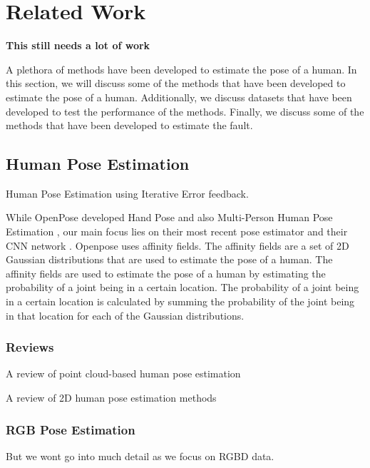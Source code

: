 \section{Related Work}
\label{sec:related_work}

\textbf{This still needs a lot of work}


A plethora of methods have been developed to estimate the pose of a human. In this section, we will discuss some of the methods that have been developed to estimate the pose of a human. Additionally, we discuss datasets that have been developed to test the performance of the methods. Finally, we discuss some of the methods that have been developed to estimate the fault.

\subsection{Human Pose Estimation}


Human Pose Estimation using Iterative Error feedback. \cite{IterativeErrorFeedback}

While OpenPose developed Hand Pose\cite{OpenPoseHand} and also Multi-Person Human Pose Estimation \cite{OpenPoseMulti}, our main focus lies on their most recent pose estimator \cite{OpenPosePose} and their CNN network \cite{OpenPoseCNN}. Openpose uses affinity fields. The affinity fields are a set of 2D Gaussian distributions that are used to estimate the pose of a human. The affinity fields are used to estimate the pose of a human by estimating the probability of a joint being in a certain location. The probability of a joint being in a certain location is calculated by summing the probability of the joint being in that location for each of the Gaussian distributions.

\subsubsection{Reviews}


A review of point cloud-based human pose estimation \cite{ReviewPointcloudHPE}

A review of 2D human pose estimation methods \cite{ReviewHPE}

\subsubsection{RGB Pose Estimation}

But we wont go into much detail as we focus on RGBD data.


